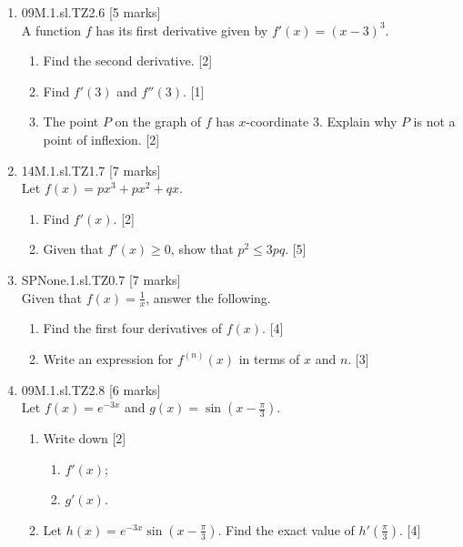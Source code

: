 \documentclass[12pt, twoside]{article}
\begin{document}
\begin{enumerate}
  \item 09M.1.sl.TZ2.6 \hfill [5 marks]\\
  A function $f$ has its first derivative given by $f'(x)=(x-3)^3$.
  \begin{enumerate}
    \item Find the second derivative. \hfill [2]
    \item Find $f'(3)$ and $f''(3)$. \hfill [1]
    \item The point $P$ on the graph of $f$ has $x$-coordinate 3. Explain why $P$ is not a point of inflexion. \hfill [2]
  \end{enumerate}

  \item 14M.1.sl.TZ1.7 \hfill [7 marks]\\
  Let $f(x)= px^3 + px^2 + qx$.
  \begin{enumerate}
    \item Find $f'(x)$. \hfill [2]
    \item Given that $f'(x) \geq 0$, show that $p^2 \leq 3pq$. \hfill [5]
  \end{enumerate}


  \item SPNone.1.sl.TZ0.7 \hfill [7 marks]\\
  Given that $f(x)= \frac{1}{x}$, answer the following.
  \begin{enumerate}
    \item Find the first four derivatives of $f(x)$. \hfill [4]
    \item Write an expression for $f^{(n)}(x)$ in terms of $x$ and $n$. \hfill [3]
  \end{enumerate}


\item 09M.1.sl.TZ2.8 \hfill [6 marks]\\
  Let $f(x)=e^{-3x}$ and $g(x)= \sin(x- \frac{\pi}{3})$.
  \begin{enumerate}
    \item Write down \hfill [2]
    \begin{enumerate}
      \item $f'(x)$;
      \item $g'(x)$.
    \end{enumerate}
    \item Let $h(x)=e^{-3x} \sin(x- \frac{\pi}{3})$. Find the exact value of $h'(\frac{\pi}{3})$. \hfill [4]
  \end{enumerate}


\end{enumerate}
\end{document}
